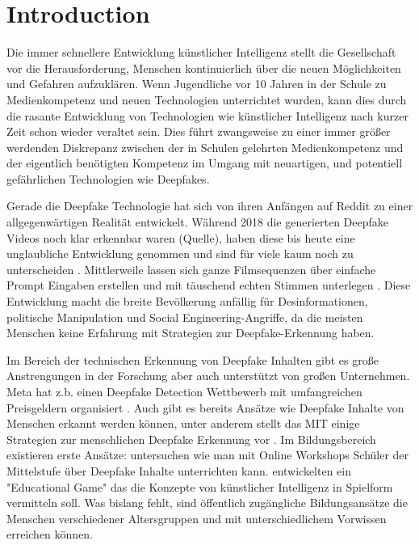 %
%


\chapter{Introduction}
\label{sec:introduction}
Die immer schnellere Entwicklung künstlicher Intelligenz stellt die Gesellschaft vor die Herausforderung, 
Menschen kontinuierlich über die neuen Möglichkeiten und Gefahren aufzuklären. 
Wenn Jugendliche vor 10 Jahren in der Schule zu Medienkompetenz und neuen Technologien unterrichtet wurden, 
kann dies durch die rasante Entwicklung von Technologien wie künstlicher Intelligenz nach kurzer Zeit schon wieder veraltet sein. 
Dies führt zwangsweise zu einer immer größer werdenden Diskrepanz zwischen der in Schulen gelehrten Medienkompetenz und der eigentlich benötigten Kompetenz im Umgang mit neuartigen, 
und potentiell gefährlichen Technologien wie Deepfakes.

Gerade die Deepfake Technologie hat sich von ihren Anfängen auf Reddit \cite{seowComprehensiveOverviewDeepfake2022} zu einer allgegenwärtigen Realität entwickelt. 
Während 2018 die generierten Deepfake Videos noch klar erkennbar waren (Quelle), 
haben diese bis heute eine unglaubliche Entwicklung genommen und sind für viele kaum noch zu unterscheiden \cite{dielHumanPerformanceDetecting2024}. 
Mittlerweile lassen sich ganze Filmsequenzen über einfache Prompt Eingaben erstellen und mit täuschend echten Stimmen unterlegen \cite{proschofskyGooglesNeueVideoKI2025}. 
Diese Entwicklung macht die breite Bevölkerung anfällig für Desinformationen, politische Manipulation und Social Engineering-Angriffe, 
da die meisten Menschen keine Erfahrung mit Strategien zur Deepfake-Erkennung haben.

Im Bereich der technischen Erkennung von Deepfake Inhalten gibt es große Anstrengungen in der Forschung aber auch unterstützt von großen Unternehmen. 
Meta hat z.b. einen Deepfake Detection Wettbewerb mit umfangreichen Preisgeldern organisiert \cite{DeepfakeDetectionChallengea}. 
Auch gibt es bereits Ansätze wie Deepfake Inhalte von Menschen  erkannt werden können, 
unter anderem stellt das MIT einige Strategien zur menschlichen Deepfake Erkennung vor \cite{ProjectOverviewDetect}. 
Im Bildungsbereich existieren erste Ansätze: \textcite{aliExploringGenerativeModels2021} untersuchen wie man mit Online Workshops Schüler der Mittelstufe über Deepfake Inhalte unterrichten kann. 
\textcite{wangBecomingFeiEducational2025} entwickelten ein "Educational Game" das die Konzepte von künstlicher Intelligenz in Spielform vermitteln soll. 
Was bislang fehlt, sind öffentlich zugängliche Bildungsansätze die Menschen verschiedener Altersgruppen und mit unterschiedlichem Vorwissen erreichen können.

